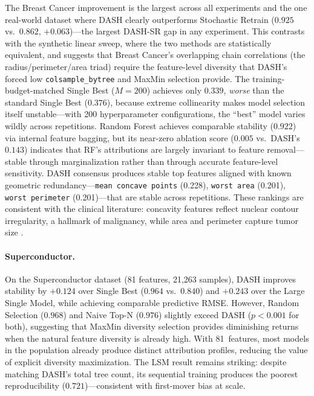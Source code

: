 \documentclass[10pt]{article}
\newcommand{\dash}{\textsc{DASH}}
\begin{document}
The Breast Cancer improvement is the largest across all experiments and
the one real-world dataset where \dash{} clearly outperforms Stochastic
Retrain ($0.925$ vs.\ $0.862$, $+0.063$)---the largest \dash{}-SR gap
in any experiment. This contrasts with the synthetic linear sweep, where
the two methods are statistically equivalent, and suggests that Breast
Cancer's overlapping chain correlations (the radius/perimeter/area triad)
require the feature-level diversity that \dash{}'s forced low
\texttt{colsample\_bytree} and MaxMin selection provide.
The training-budget-matched Single Best ($M{=}200$) achieves only $0.339$,
\emph{worse} than the standard Single Best ($0.376$), because extreme
collinearity makes model selection itself unstable---with 200
hyperparameter configurations, the ``best'' model varies wildly across
repetitions. Random Forest achieves comparable stability ($0.922$) via
internal feature bagging, but its near-zero ablation score ($0.005$
vs.\ \dash{}'s $0.143$) indicates that RF's attributions are largely
invariant to feature removal---stable through marginalization rather than
through accurate feature-level sensitivity. \dash{} consensus produces
stable top features aligned with known geometric
redundancy---\texttt{mean concave points} (0.228), \texttt{worst area}
(0.201), \texttt{worst perimeter} (0.201)---that are stable across
repetitions.  These rankings are consistent with the clinical literature:
concavity features reflect nuclear contour irregularity, a hallmark of
malignancy, while area and perimeter capture tumor size
\citep{street1993nuclear}.

\paragraph{Superconductor.}
On the Superconductor dataset (81 features, 21,263 samples), \dash{}
improves stability by $+0.124$ over Single Best ($0.964$ vs.\ $0.840$)
and $+0.243$ over the Large Single Model, while achieving comparable
predictive RMSE. However, Random Selection ($0.968$) and Naive Top-N
($0.976$) slightly exceed \dash{} ($p < 0.001$ for both), suggesting
that MaxMin diversity selection provides diminishing returns when the
natural feature diversity is already high. With 81~features, most models
in the population already produce distinct attribution profiles, reducing
the value of explicit diversity maximization.
The LSM result remains striking: despite matching \dash{}'s total tree count,
its sequential training produces the poorest reproducibility ($0.721$)---consistent
with first-mover bias at scale.
\end{document}
